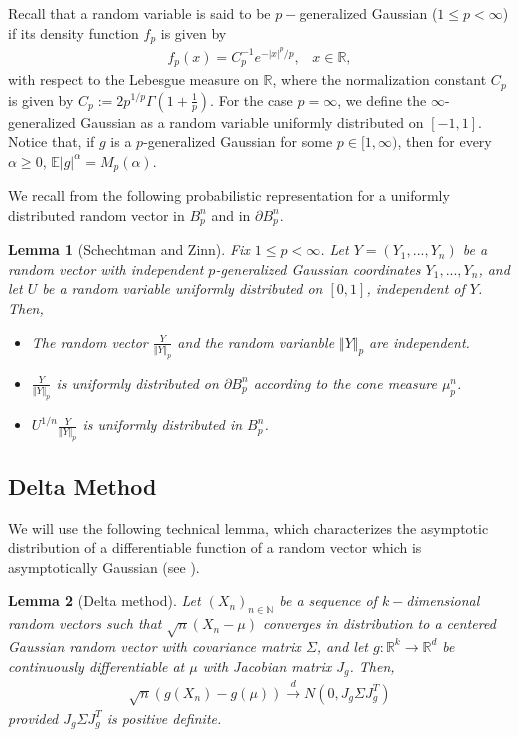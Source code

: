 \documentclass[10pt]{amsart}
\newtheorem{lemma}{Lemma}[section]
\newcounter{theor}
\def\R{\mathbb{R}}
\def\N{\mathbb{N}}
\def\E{\mathbb{E}}
\numberwithin{equation}{section}
\begin{document}
Recall that a random variable is said to be $p-$generalized Gaussian ($1\leq p < \infty$) if its density function $f_p$ is given by
\begin{align*}
f_p(x) = C_p^{-1} e^{- |x|^p / p}, \; \; \; x \in \R,
\end{align*}
with respect to the Lebesgue measure on $\R$, where the normalization constant $C_p$ is given by $C_p:= 2 p^{1/p} \Gamma \left(1 + \frac{1}{p} \right)$. For the case $p=\infty$, we define the $\infty$-generalized Gaussian as a random variable uniformly distributed on $[-1,1]$. Notice that, if $g$ is a $p$-generalized Gaussian for some $p \in [1, \infty)$, then for every $\alpha \geq 0$, $\E | g |^\alpha = M_p(\alpha )$.

We recall from \cite{SZ} the following probabilistic representation for a uniformly distributed random vector in $B_p^n$ and in $\partial B_p^n$.

\begin{lemma}[Schechtman and Zinn]
\label{Lem:SchAndZinn}
Fix $1\leq p < \infty$. Let $Y = (Y_1, ... , Y_n)$ be a random vector with independent $p$-generalized Gaussian coordinates $Y_1,...,Y_n$, and let $U$ be a random variable uniformly distributed on $[0,1]$, independent of $Y$. Then,

\begin{itemize}

\item The random vector $\displaystyle{\frac{Y}{\Vert Y \Vert _p}}$ and the random varianble $\Vert Y \Vert _p$ are independent.

\item $\displaystyle{\frac{Y}{\Vert Y \Vert _p}}$ is uniformly distributed on $\partial B_p^n$ according to the cone measure $\mu _p^n$.

\item $\displaystyle{U^{1/n} \frac{Y}{\Vert Y \Vert _p}}$ is uniformly distributed in $B_p^n$.

\end{itemize}
\end{lemma}

\subsection{Delta Method} 
We will use the following technical lemma, which characterizes the asymptotic distribution of a differentiable function of a random vector which is asymptotically Gaussian (see \cite{O}).

\begin{lemma}[Delta method]
\label{DeltaMethod}
Let $(X_n)_{n\in\N}$ be a sequence of $k-$dimensional random vectors such that $\sqrt{n}(X_n - \mu)$ converges in distribution to a centered Gaussian random vector with covariance matrix $\Sigma$, and let $g:\mathbb{R}^k \to \R^d$ be continuously differentiable at $\mu$ with Jacobian matrix $J_g$. Then,
\begin{align*}
\sqrt{n} (g(X_n) - g(\mu) ) \overset{d}{\longrightarrow} N\left( 0 , J_g \Sigma J_g^T \right)
\end{align*}
provided $J_g \Sigma J_g^T$ is positive definite.
\end{lemma}
\end{document}

